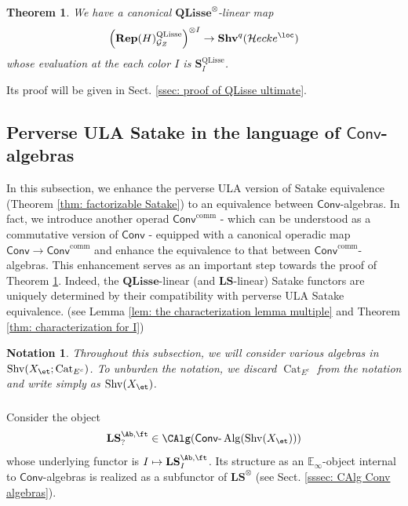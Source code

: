 \documentclass[10pt]{amsart}
\newcommand{\sssec}{\subsubsection}
\newtheorem{thm}[subsubsection]{Theorem}
\newtheorem{nota}[subsubsection]{Notation}
\theoremstyle{remark}
\newcommand{\E}{\mathbb{E}}
\newcommand{\on}{\operatorname}
\newcommand{\cG}{\mathcal{G}}
\newcommand{\Cat}{\on{Cat}}
\newcommand{\CatEc}{\Cat_{E^c}}
\newcommand{\lAlg}{\text{-}\on{Alg}}
\newcommand{\Shv}{\on{Shv}}
\newcommand{\QLisse}{\on{QLisse}}
\newcommand{\Conv}{\mathsf{Conv}}
\newcommand{\Convcomm}{\mathsf{Conv}^{\on{comm}}}
\newcommand{\cHecke}{\mathcal{H}ecke}
\begin{document}
   \begin{thm}\label{thm: QLisse Satake ultimate}
      We have a canonical $\mathbf{QLisse}^{\otimes}$-linear map
\begin{equation}
    \left(\mathbf{Rep}(H)^{\QLisse}_{\cG_Z}\right)^{\otimes I}\rightarrow \mathbf{Shv}^q(\cHecke^{\loc})
\end{equation}
whose evaluation at the each color $I$ is $\mathbf{S}^{\QLisse}_{I}$.
   \end{thm}

   Its proof will be given in Sect. \ref{ssec: proof of QLisse ultimate}.
    
    \subsection{Perverse ULA Satake in the language of $\Conv$-algebras}\label{ssec: Perv ULA Satake in Conv language}
    In this subsection, we enhance the perverse ULA version of Satake equivalence (Theorem \ref{thm: factorizable Satake}) to an equivalence between $\Conv$-algebras. In fact, we introduce another operad $\Convcomm$ - which can be understood as a commutative version of $\Conv$ - equipped with a canonical operadic map $\Conv\rightarrow \Convcomm$ and enhance the equivalence to that between $\Convcomm$-algebras. This enhancement serves as an important step towards the proof of Theorem \ref{thm: QLisse Satake ultimate}. Indeed, the $\mathbf{QLisse}$-linear (and $\mathbf{LS}$-linear) Satake functors are uniquely determined by their compatibility with perverse ULA Satake equivalence. (see Lemma \ref{lem: the characterization lemma multiple} and Theorem \ref{thm: characterization for I})

    \begin{nota}
        Throughout this subsection, we will consider various algebras in $\Shv(X_{\et};\CatEc)$. To unburden the notation, we discard $\CatEc$ from the notation and write simply as $\Shv(X_{\et})$.
    \end{nota}

    \sssec{}
    Consider the object
    \[\mathbf{LS}^{\Ab,\ft}_?\in\CAlg(\Conv\lAlg(\Shv(X_{\et})))\]
    whose underlying functor is $I\mapsto \mathbf{LS}^{\Ab,\ft}_I$. Its structure as an $\E_{\infty}$-object internal to $\Conv$-algebras is realized as a subfunctor of $\mathbf{LS}^{\otimes}$ (see Sect. \ref{sssec: CAlg Conv algebras}). 
    \medskip
    
\end{document}
